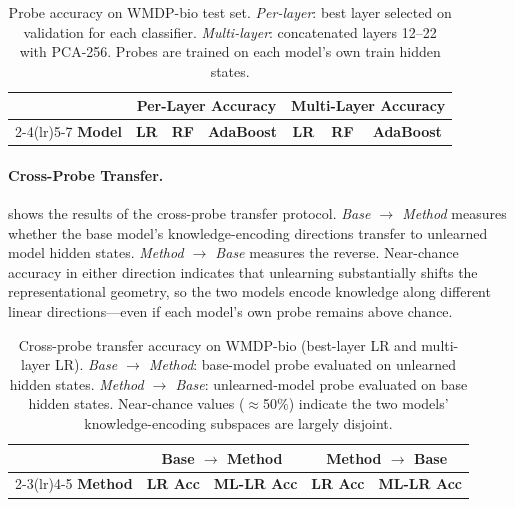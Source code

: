 \begin{table}[H]
\centering
\caption{Probe accuracy on WMDP-bio test set.
\emph{Per-layer}: best layer selected on validation for each classifier.
\emph{Multi-layer}: concatenated layers 12--22 with PCA-256.
Probes are trained on each model's own train hidden states.}
\label{tab:probes-bio}
\setlength{\tabcolsep}{4pt}
\small
\begin{tabular}{lcccccc}
\toprule
 & \multicolumn{3}{c}{\textbf{Per-Layer Accuracy}} & \multicolumn{3}{c}{\textbf{Multi-Layer Accuracy}} \\
\cmidrule(lr){2-4}\cmidrule(lr){5-7}
\textbf{Model} & \textbf{LR} & \textbf{RF} & \textbf{AdaBoost} & \textbf{LR} & \textbf{RF} & \textbf{AdaBoost} \\
\midrule

\bottomrule
\end{tabular}
\end{table}

\paragraph{Cross-Probe Transfer.}
\label{sec:cross-probe-results}

 shows the results of the cross-probe transfer protocol.
\emph{Base $\to$ Method} measures whether the base model's knowledge-encoding
directions transfer to unlearned model hidden states.
\emph{Method $\to$ Base} measures the reverse.
Near-chance accuracy in either direction indicates that unlearning substantially
shifts the representational geometry, so the two models encode knowledge along
different linear directions---even if each model's own probe remains above chance.

\begin{table}[H]
\centering
\caption{Cross-probe transfer accuracy on WMDP-bio (best-layer LR and multi-layer LR).
\emph{Base $\to$ Method}: base-model probe evaluated on unlearned hidden states.
\emph{Method $\to$ Base}: unlearned-model probe evaluated on base hidden states.
Near-chance values ($\approx$50\%) indicate the two models' knowledge-encoding subspaces
are largely disjoint.}
\label{tab:cross-probe}
\small
\begin{tabular}{lcccc}
\toprule
 & \multicolumn{2}{c}{\textbf{Base $\to$ Method}} & \multicolumn{2}{c}{\textbf{Method $\to$ Base}} \\
\cmidrule(lr){2-3}\cmidrule(lr){4-5}
\textbf{Method} & \textbf{LR Acc} & \textbf{ML-LR Acc} & \textbf{LR Acc} & \textbf{ML-LR Acc} \\
\midrule

\bottomrule
\end{tabular}
\end{table}

